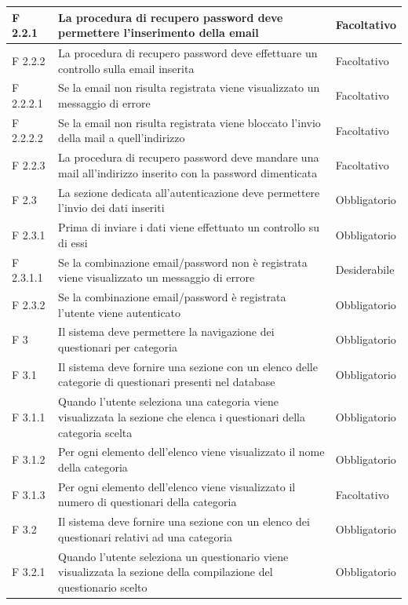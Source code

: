 \documentclass[a4paper,11pt]{article}
\begin{document}
\begin{longtable}{p{}p{}p{}}
\midrule
F 2.2.1 & La procedura di recupero password deve permettere l'inserimento della email & Facoltativo\\
\midrule
F 2.2.2 & La procedura di recupero password deve effettuare un controllo sulla email inserita & Facoltativo\\
\midrule
F 2.2.2.1 & Se la email non risulta registrata viene visualizzato un messaggio di errore & Facoltativo\\
\midrule
F 2.2.2.2 & Se la email non risulta registrata viene bloccato l'invio della mail a quell'indirizzo & Facoltativo\\
\midrule
F 2.2.3 & La procedura di recupero password deve mandare una mail all'indirizzo inserito con la password dimenticata & Facoltativo\\
\midrule
F 2.3 & La sezione dedicata all'autenticazione deve permettere l'invio dei dati inseriti & Obbligatorio\\
\midrule
F 2.3.1 & Prima di inviare i dati viene effettuato un controllo su di essi & Obbligatorio\\
\midrule
F 2.3.1.1 & Se la combinazione email/password non è registrata viene visualizzato un messaggio di errore & Desiderabile\\
\midrule
F 2.3.2 & Se la combinazione email/password è registrata l'utente viene autenticato & Obbligatorio\\
\midrule
F 3 & Il sistema deve permettere la navigazione dei questionari per categoria & Obbligatorio\\
\midrule
F 3.1 & Il sistema deve fornire una sezione con un elenco delle categorie di questionari presenti nel database & Obbligatorio\\
\midrule
F 3.1.1 & Quando l'utente seleziona una categoria viene visualizzata la sezione che elenca i questionari della categoria scelta & Obbligatorio\\
\midrule
F 3.1.2 & Per ogni elemento dell'elenco viene visualizzato il nome della categoria & Obbligatorio\\
\midrule
F 3.1.3 & Per ogni elemento dell'elenco viene visualizzato il numero di questionari della categoria & Facoltativo\\
\midrule
F 3.2 & Il sistema deve fornire una sezione con un elenco dei questionari relativi ad una categoria & Obbligatorio\\
\midrule
F 3.2.1 & Quando l'utente seleziona un questionario viene visualizzata la sezione della compilazione del questionario scelto & Obbligatorio\\

\end{longtable}
\end{document}
